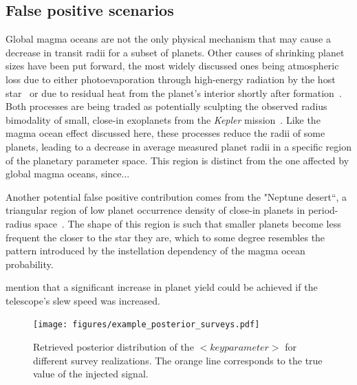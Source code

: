 \documentclass[modern]{aastex631}
\begin{document}
\subsection{False positive scenarios}
\begin{note}
Global magma oceans are not the only physical mechanism that may cause a decrease in transit radii for a subset of planets.
Other causes of shrinking planet sizes have been put forward, the most widely discussed ones being atmospheric loss due to either photoevaporation through high-energy radiation by the host star~\citep[e.g.,][]{Owen2013,Jin2014,Mordasini2020a} or due to residual heat from the planet's interior shortly after formation~\citep{Ginzburg2016b,Ginzburg2018,Gupta2019}.
    Both processes are being traded as potentially sculpting the observed radius bimodality of small, close-in exoplanets from the \textit{Kepler} mission~\citep{Fulton2017,VanEylen2018}.
    Like the magma ocean effect discussed here, these processes reduce the radii of some planets, leading to a decrease in average measured planet radii in a specific region of the planetary parameter space.
    This region is distinct from the one affected by global magma oceans, since... 

    Another potential false positive contribution comes from the "Neptune desert``, a triangular region of low planet occurrence density of close-in planets in period-radius space~\citep{Szabo2011,Mazeh2016,Dreizler2020b}.
    The shape of this region is such that smaller planets become less frequent the closer to the star they are, which to some degree resembles the pattern introduced by the instellation dependency of the magma ocean probability.
\end{note}


\begin{note}
    \citet{Penny2019} mention that a significant increase in planet yield could be achieved if the telescope's slew speed was increased.
\end{note}

\begin{figure}[ht!]
    \begin{centering}

        \texttt{[image: figures/example\_posterior\_surveys.pdf]}
        \caption{
        Retrieved posterior distribution of the $<key parameter>$ for different survey realizations.
        The orange line corresponds to the true value of the injected signal.
        }
        \label{fig:posterior_surveys}
    \end{centering}
\end{figure}
\end{document}
